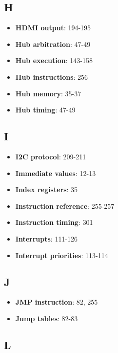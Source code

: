 \documentclass[11pt]{book}
\providecommand{\tightlist}{%
  \setlength{\itemsep}{0pt}\setlength{\parskip}{0pt}}
\begin{document}
\hypertarget{h}{%
\subsection{H}\label{h}}

\begin{itemize}
\tightlist
\item
  \textbf{HDMI output}: 194-195
\item
  \textbf{Hub arbitration}: 47-49
\item
  \textbf{Hub execution}: 143-158
\item
  \textbf{Hub instructions}: 256
\item
  \textbf{Hub memory}: 35-37
\item
  \textbf{Hub timing}: 47-49
\end{itemize}

\hypertarget{i}{%
\subsection{I}\label{i}}

\begin{itemize}
\tightlist
\item
  \textbf{I2C protocol}: 209-211
\item
  \textbf{Immediate values}: 12-13
\item
  \textbf{Index registers}: 35
\item
  \textbf{Instruction reference}: 255-257
\item
  \textbf{Instruction timing}: 301
\item
  \textbf{Interrupts}: 111-126
\item
  \textbf{Interrupt priorities}: 113-114
\end{itemize}

\hypertarget{j}{%
\subsection{J}\label{j}}

\begin{itemize}
\tightlist
\item
  \textbf{JMP instruction}: 82, 255
\item
  \textbf{Jump tables}: 82-83
\end{itemize}

\hypertarget{l}{%
\subsection{L}\label{l}}
\end{document}
